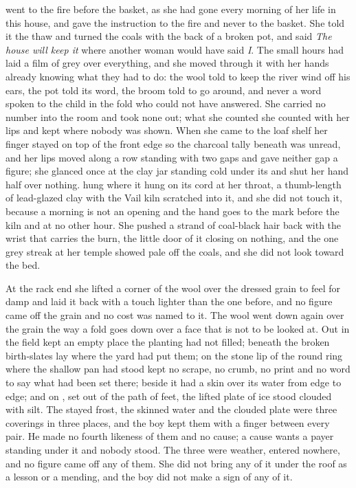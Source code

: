 \scenebreak

 went to the fire before the basket, as she had gone every morning of her life in this house, and gave the instruction to the fire and never to the basket. She told it the thaw and turned the coals with the back of a broken pot, and said \emph{The house will keep it} where another woman would have said \emph{I}. The small hours had laid a film of grey over everything, and she moved through it with her hands already knowing what they had to do: the wool told to keep the river wind off his ears, the pot told its word, the broom told to go around, and never a word spoken to the child in the fold who could not have answered. She carried no number into the room and took none out; what she counted she counted with her lips and kept where nobody was shown. When she came to the loaf shelf her finger stayed on top of the front edge so the charcoal tally beneath was unread, and her lips moved along a row standing with two gaps and gave neither gap a figure; she glanced once at the clay jar standing cold under its  and shut her hand half over nothing.  hung where it hung on its cord at her throat, a thumb-length of lead-glazed clay with the Vail kiln scratched into it, and she did not touch it, because a morning is not an opening and the hand goes to the mark before the kiln and at no other hour. She pushed a strand of coal-black hair back with the wrist that carries the burn, the little door of it closing on nothing, and the one grey streak at her temple showed pale off the coals, and she did not look toward the bed.

At the rack end she lifted a corner of the wool over the dressed grain to feel for damp and laid it back with a touch lighter than the one before, and no figure came off the grain and no cost was named to it. The wool went down again over the grain the way a fold goes down over a face that is not to be looked at. Out in  the field kept an empty place the planting had not filled; beneath  the broken birth-slates lay where the yard had put them; on the stone lip of  the round ring where the shallow pan had stood kept no scrape, no crumb, no print and no word to say what had been set there;  beside it had a skin over its water from edge to edge; and on , set out of the path of feet, the lifted plate of ice stood clouded with silt. The stayed frost, the skinned water and the clouded plate were three coverings in three places, and the boy kept them with a finger between every pair. He made no fourth likeness of them and no cause; a cause wants a payer standing under it and nobody stood. The three were weather, entered nowhere, and no figure came off any of them. She did not bring any of it under the roof as a lesson or a mending, and the boy did not make a sign of any of it.

